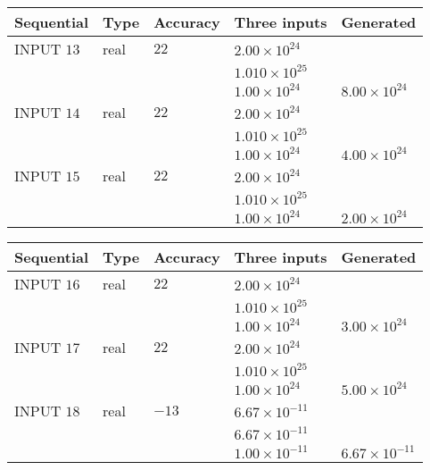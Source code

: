 \documentclass[12pt]{article}
\begin{document}
   
  
  
\noindent\begin{tabular}{|l|l|l|l|l|}
\hline
 Sequential & Type & Accuracy & Three inputs & Generated \\ 
\hline
 
 
  INPUT $           13 $ & real & $           22  $ & $
 2.00 \times 10^{24}
  $ & \\
  & & &  $
 1.010 \times 10^{25}
  $ & \\
  & & &  $
 1.00 \times 10^{24}
 $ & $ 8.00 \times 10^{24} $ 
 \\  \hline  
 
 
  INPUT $           14 $ & real & $           22  $ & $
 2.00 \times 10^{24}
  $ & \\
  & & &  $
 1.010 \times 10^{25}
  $ & \\
  & & &  $
 1.00 \times 10^{24}
 $ & $ 4.00 \times 10^{24} $ 
 \\  \hline  
 
 
  INPUT $           15 $ & real & $           22  $ & $
 2.00 \times 10^{24}
  $ & \\
  & & &  $
 1.010 \times 10^{25}
  $ & \\
  & & &  $
 1.00 \times 10^{24}
 $ & $ 2.00 \times 10^{24} $ 
 \\  \hline  
 \end{tabular}
   
   
  
  
\noindent\begin{tabular}{|l|l|l|l|l|}
\hline
 Sequential & Type & Accuracy & Three inputs & Generated \\ 
\hline
 
 
  INPUT $           16 $ & real & $           22  $ & $
 2.00 \times 10^{24}
  $ & \\
  & & &  $
 1.010 \times 10^{25}
  $ & \\
  & & &  $
 1.00 \times 10^{24}
 $ & $ 3.00 \times 10^{24} $ 
 \\  \hline  
 
 
  INPUT $           17 $ & real & $           22  $ & $
 2.00 \times 10^{24}
  $ & \\
  & & &  $
 1.010 \times 10^{25}
  $ & \\
  & & &  $
 1.00 \times 10^{24}
 $ & $ 5.00 \times 10^{24} $ 
 \\  \hline  
 
 
  INPUT $           18 $ & real & $          -13  $ & $
 6.67 \times 10^{-11}
  $ & \\
  & & &  $
 6.67 \times 10^{-11}
  $ & \\
  & & &  $
 1.00 \times 10^{-11}
 $ & $ 6.67 \times 10^{-11} $ 
 \\  \hline  
 \end{tabular}
   
\end{document}

